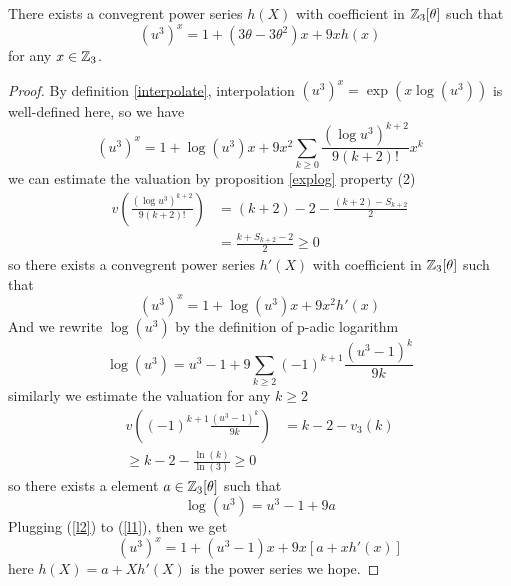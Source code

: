     \begin{lemma}
        There exists a convegrent power series \(h(X)\) with coefficient in \(\mathbb{Z}_3[\theta]\) such that
        \begin{equation} \label{eq1}
            (u^3)^x = 1 + (3\theta-3\theta^2)x+9xh(x)
         \end{equation}
        for any \(x \in \mathbb{Z}_3\).

        \begin{proof}
            By definition \ref{interpolate}, interpolation \((u^3)^x = \exp(x \log(u^3))\) is well-defined here, so we have
            \[(u^3)^x = 1+ \log(u^3)x + 9x^2 \sum_{k \geq 0} \frac{(\log u^3)^{k+2}}{9(k+2)!}x^k\]
            we can estimate the valuation by proposition \ref{explog} property (2)
            \begin{align*}
                v(\frac{(\log u^3)^{k+2}}{9(k+2)!}) &= (k+2)-2-\frac{(k+2)-S_{k+2}}{2} \\
                &= \frac{k+S_{k+2}-2}{2} \geq 0
            \end{align*}
            so there exists a convegrent power series \(h'(X)\) with coefficient in \(\mathbb{Z}_3[\theta]\) such that 
            \begin{equation} \label{l1}
                (u^3)^x = 1+ \log(u^3)x + 9x^2h'(x)
            \end{equation}
            And we rewrite \(\log(u^3)\) by the definition of p-adic logarithm
            \[\log(u^3) = u^3-1 + 9\sum_{k \geq 2} (-1)^{k+1}\frac{(u^3-1)^k}{9k}\]
            similarly we estimate the valuation for any \(k\geq 2\)
            \begin{align*}
                v((-1)^{k+1}\frac{(u^3-1)^k}{9k}) &= k-2-v_3(k) \\
                \geq k-2-\frac{\ln(k)}{\ln(3)} \geq 0
            \end{align*}
            so there exists a element \(a \in \mathbb{Z}_3[\theta]\) such that
            \begin{equation} \label{l2}
                \log(u^3) = u^3-1 + 9a
            \end{equation}
            Plugging (\ref{l2}) to (\ref{l1}), then we get
            \[(u^3)^x = 1+(u^3-1)x+9x[a+xh'(x)]\]
            here \(h(X) = a+Xh'(X)\) is the power series we hope.
        \end{proof}


    \end{lemma}

